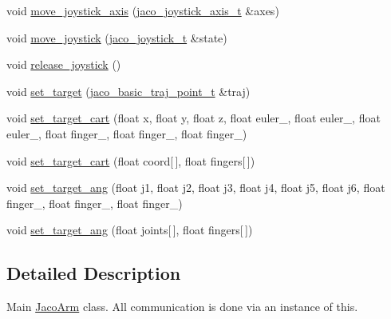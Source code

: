 \begin{DoxyCompactItemize}
void \hyperlink{classKinDrv_1_1JacoArm_af2751d0cd1fb8e9437418e70dfc84361}{move\+\_\+joystick\+\_\+axis} (\hyperlink{structKinDrv_1_1jaco__joystick__axis__t}{jaco\+\_\+joystick\+\_\+axis\+\_\+t} \&axes)
\item 
void \hyperlink{classKinDrv_1_1JacoArm_acbbda8dd4a8663b271cd231394bed85e}{move\+\_\+joystick} (\hyperlink{structKinDrv_1_1jaco__joystick__t}{jaco\+\_\+joystick\+\_\+t} \&state)
\item 
void \hyperlink{classKinDrv_1_1JacoArm_aeb3441b499b7ee7051d319d9218591fc}{release\+\_\+joystick} ()
\item 
void \hyperlink{classKinDrv_1_1JacoArm_a8185623d10c059de4db428460dc17aaa}{set\+\_\+target} (\hyperlink{structKinDrv_1_1jaco__basic__traj__point__t}{jaco\+\_\+basic\+\_\+traj\+\_\+point\+\_\+t} \&traj)
\item 
void \hyperlink{classKinDrv_1_1JacoArm_a5d73735b73ff00be54929cdbf1fdcf99}{set\+\_\+target\+\_\+cart} (float x, float y, float z, float euler\+\_, float euler\+\_, float euler\+\_, float finger\+\_, float finger\+\_, float finger\+\_)
\item 
void \hyperlink{classKinDrv_1_1JacoArm_abe14a7ea7e04f86923eb44ec79336e9e}{set\+\_\+target\+\_\+cart} (float coord\mbox{[}$\,$\mbox{]}, float fingers\mbox{[}$\,$\mbox{]})
\item 
void \hyperlink{classKinDrv_1_1JacoArm_a8a71e8e0955e165d59dab18db8210c67}{set\+\_\+target\+\_\+ang} (float j1, float j2, float j3, float j4, float j5, float j6, float finger\+\_, float finger\+\_, float finger\+\_)
\item 
void \hyperlink{classKinDrv_1_1JacoArm_ad17522bc63a533638f2529fa1fbccf2c}{set\+\_\+target\+\_\+ang} (float joints\mbox{[}$\,$\mbox{]}, float fingers\mbox{[}$\,$\mbox{]})
\end{DoxyCompactItemize}


\subsection{Detailed Description}
Main \hyperlink{classKinDrv_1_1JacoArm}{Jaco\+Arm} class. All communication is done via an instance of this. 

